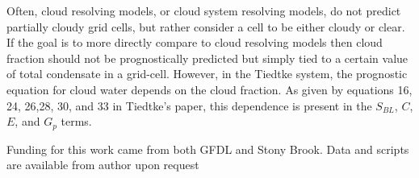 \documentclass[draft]{agujournal2019}
\begin{document}
Often, cloud resolving models, or cloud system resolving models, do not predict partially cloudy grid cells, but rather consider a cell to be either cloudy or clear.  If the goal is to more directly compare to cloud resolving models then cloud fraction should not be prognostically predicted but simply tied to a certain value of total condensate in a grid-cell.  However, in the Tiedtke system, the prognostic equation for cloud water depends on the cloud fraction.  As given by equations 16, 24, 26,28, 30, and 33 in Tiedtke's paper, this dependence is present in the $S_{BL}$, $C$, $E$, and $G_{p}$ terms. 

\acknowledgments
Funding for this work came from both GFDL and Stony Brook.  Data and scripts are available from author upon request



%
%
%
%  
  
\end{document}
